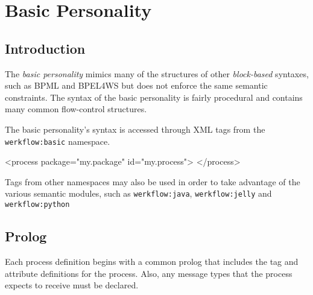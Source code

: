
\chapter{Basic Personality}


\section{Introduction}

The \emph{basic personality} mimics many of the structures
of other \emph{block-based} syntaxes, such as BPML and BPEL4WS
but does not enforce the same semantic constraints.  The syntax of
the basic personality is fairly procedural and contains many common
flow-control structures.

The basic personality's syntax is accessed through XML tags from
the \verb|werkflow:basic| namespace.

\begin{codelisting}
<process 
         package="my.package"
         id="my.process">
</process>
\end{codelisting}

Tags from other namespaces may also be used in order to 
take advantage of the various semantic modules, such
as \verb|werkflow:java|, \verb|werkflow:jelly| and 
\verb|werkflow:python|


\section{Prolog}

Each process definition begins with a common prolog that includes
the  tag and attribute definitions for the process.
Also, any message types that the process expects to receive must
be declared.

\subsection{}

